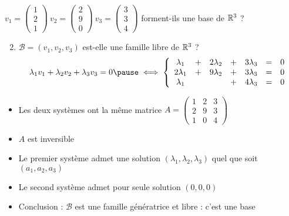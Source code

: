 \begin{frame}
\begin{exemple}

$v_1 = \left(\begin{smallmatrix}1\\2\\1\end{smallmatrix}\right)~ 
  v_2 = \left(\begin{smallmatrix}2\\9\\0\end{smallmatrix}\right)~
  v_3 = \left(\begin{smallmatrix}3\\3\\4\end{smallmatrix}\right)$
  forment-ils une base de $\mathbb{R}^3$ ?

\begin{enumerate}
  \setcounter{enumi}{1}
  \item $\mathcal{B} = (v_1, v_2, v_3)$ est-elle une famille libre de $\mathbb{R}^3$ ? 
\vspace*{-1ex}\pause  
      $$ \lambda_1 v_1+ \lambda_2 v_2 + \lambda_3 v_3= 0 \pause \iff 
\left\{
\begin{array}{ccccccc}
\lambda_1 &+ &2\lambda_2 &+ &3\lambda_3 & = & 0\\
2\lambda_1 &+ &9\lambda_2 &+ &3\lambda_3 & = & 0\\
\lambda_1 &&& + &4\lambda_3 & = & 0\\
\end{array} \right.      
$$
\vspace*{-2ex}
\end{enumerate}
\pause
\begin{itemize}
  \item Les deux systèmes ont la même matrice $A = \left(\begin{smallmatrix}
1 & 2 & 3\\
2 & 9 & 3\\
1 &0 & 4\end{smallmatrix}\right)$
\pause
  \item $A$ est inversible
\pause  
  \item Le premier système admet une solution $(\lambda_1,\lambda_2,\lambda_3)$ 
  quel que soit $(a_1,a_2,a_3)$
\pause  
  \item Le second système admet pour seule solution $(0,0,0)$
\pause  
  \item Conclusion : $\mathcal{B}$ est une famille génératrice et libre : c'est une base
  
\end{itemize}

\end{exemple}
\end{frame}
